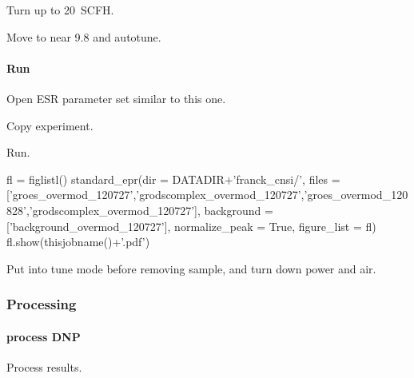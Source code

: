 Turn up to 20~SCFH.

Move to near 9.8 and autotune.

\paragraph{Run}

Open ESR parameter set similar to this one.

Copy experiment.





Run.

\begin{tiny}
\begin{python}[off]
fl = figlistl()
standard_epr(dir = DATADIR+'franck_cnsi/',
    files = ['groes_overmod_120727','grodscomplex_overmod_120727','groes_overmod_120828','grodscomplex_overmod_120727'],
    background = ['background_overmod_120727'],
    normalize_peak = True,
    figure_list = fl)
fl.show(thisjobname()+'.pdf')
\end{python}
\end{tiny}

Put into tune mode before removing sample, and turn down power and air.

\subsubsection{Processing}
\paragraph{process DNP}
Process results.


